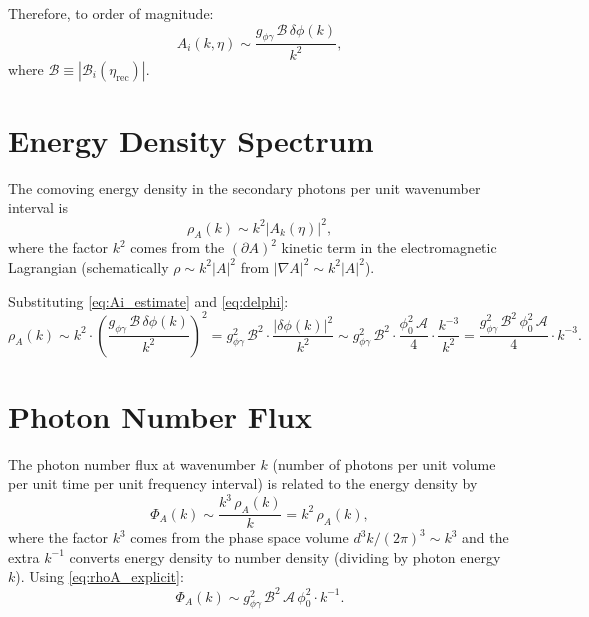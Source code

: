 \documentclass[12pt,a4paper]{report}
\newcommand{\gag}{g_{\phi\gamma}}
\newcommand{\phizero}{\phi_0}
\theoremstyle{definition}
\begin{document}
Therefore, to order of magnitude:
\begin{equation}
  A_i(k,\eta) \sim \frac{\gag\,\mathcal{B}\,\delta\phi(k)}{k^2},
  \label{eq:Ai_estimate}
\end{equation}
where $\mathcal{B}\equiv|\mathcal{B}_i(\eta_{\mathrm{rec}})|$.

\section{Energy Density Spectrum}

The comoving energy density in the secondary photons per unit wavenumber interval is
\begin{equation}
  \rho_A(k) \sim k^2 |A_k(\eta)|^2,
  \label{eq:rhoA}
\end{equation}
where the factor $k^2$ comes from the $(\partial A)^2$ kinetic term in the
electromagnetic Lagrangian (schematically $\rho\sim k^2|A|^2$ from $|\nabla A|^2\sim k^2|A|^2$).

Substituting \eqref{eq:Ai_estimate} and \eqref{eq:delphi}:
\begin{equation}
  \rho_A(k) \sim k^2\cdot\left(\frac{\gag\,\mathcal{B}\,\delta\phi(k)}{k^2}\right)^2
  = \gag^2\,\mathcal{B}^2\cdot\frac{|\delta\phi(k)|^2}{k^2}
  \sim \gag^2\,\mathcal{B}^2\cdot
    \frac{\phizero^2\,\mathcal{A}}{4}\cdot\frac{k^{-3}}{k^2}
  = \frac{\gag^2\,\mathcal{B}^2\,\phizero^2\,\mathcal{A}}{4}\cdot k^{-3}.
  \label{eq:rhoA_explicit}
\end{equation}

\section{Photon Number Flux}

The photon number flux at wavenumber $k$ (number of photons per unit volume per unit
time per unit frequency interval) is related to the energy density by
\begin{equation}
  \Phi_A(k) \sim \frac{k^3\,\rho_A(k)}{k} = k^2\,\rho_A(k),
  \label{eq:flux_def}
\end{equation}
where the factor $k^3$ comes from the phase space volume $d^3k/(2\pi)^3\sim k^3$
and the extra $k^{-1}$ converts energy density to number density (dividing by photon
energy $k$). Using \eqref{eq:rhoA_explicit}:
\begin{equation}
  \Phi_A(k) \sim \gag^2\,\mathcal{B}^2\,\mathcal{A}\,\phizero^2\cdot k^{-1}.
  \label{eq:flux}
\end{equation}
\end{document}
